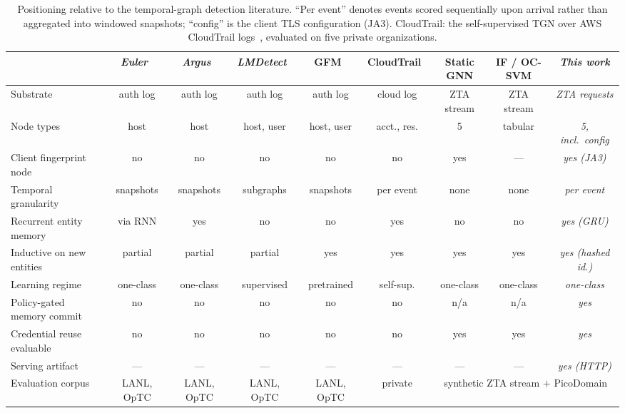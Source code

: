 \begin{table}[ht!]
\centering
\renewcommand{\arraystretch}{1.5}
\footnotesize
\setlength{\tabcolsep}{2.5pt}
\begin{tabular}{lcccccccc}
\toprule
& \textit{Euler}~\cite{euler} & \textit{Argus}~\cite{argus} & \textit{LMDetect}~\cite{lmdetect} & GFM~\cite{gfm} & CloudTrail~\cite{cloudtrailtgn} & Static GNN & IF / OC-SVM & \textit{This work} \\
\midrule
Substrate            & auth log & auth log & auth log & auth log & cloud log & ZTA stream & ZTA stream & \textit{ZTA requests} \\
Node types           & host & host & host, user & host, user & acct., res. & 5 & tabular & \textit{5, incl.\ config} \\
Client fingerprint node & no & no & no & no & no & yes & --- & \textit{yes (JA3)} \\
Temporal granularity & snapshots & snapshots & subgraphs & snapshots & per event & none & none & \textit{per event} \\
Recurrent entity memory & via RNN & yes & no & no & yes & no & no & \textit{yes (GRU)} \\
Inductive on new entities & partial & partial & partial & yes & yes & yes & yes & \textit{yes (hashed id.)} \\
Learning regime      & one-class & one-class & supervised & pretrained & self-sup. & one-class & one-class & \textit{one-class} \\
Policy-gated memory commit & no & no & no & no & no & n/a & n/a & \textit{yes} \\
Credential reuse evaluable & no & no & no & no & no & yes & yes & \textit{yes} \\
Serving artifact & --- & --- & --- & --- & --- & --- & --- & \textit{yes (HTTP)} \\
Evaluation corpus & LANL, OpTC & LANL, OpTC & LANL, OpTC & LANL, OpTC & private & \multicolumn{3}{c}{synthetic ZTA stream $+$ PicoDomain} \\
\bottomrule
\end{tabular}
\caption{Positioning relative to the temporal-graph detection literature.
``Per event'' denotes events scored sequentially upon arrival rather than aggregated
into windowed snapshots; ``config'' is the client TLS configuration (JA3). CloudTrail: the self-supervised TGN over AWS CloudTrail
logs~\cite{cloudtrailtgn}, evaluated on five private organizations.}
\label{tab:qualitative}
\end{table}

